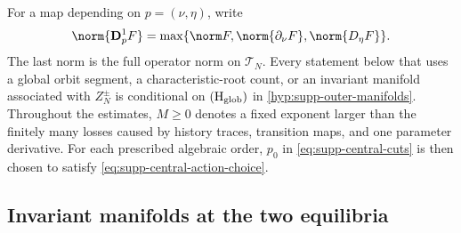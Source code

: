 For a map depending on \(p=(\nu,\eta)\), write
\[
 \norm{\mathbf D_p^1F}
 =\max\{\norm F,\norm{\partial_\nu F},\norm{D_\eta F}\}.
\]
The last norm is the full operator norm on
\(\mathcal T_N\).
Every statement below that uses a global orbit segment, a characteristic-root
count, or an invariant manifold associated with \(Z_N^\pm\) is conditional on
\(\mathrm{(H_{\rm glob})}\) in
\cref{hyp:supp-outer-manifolds}.
Throughout the estimates, \(M\ge0\) denotes a fixed exponent larger than
the finitely many losses caused by history traces, transition maps, and one
parameter derivative.  For each prescribed algebraic order, \(p_0\) in
\cref{eq:supp-central-cuts} is then chosen to satisfy
\cref{eq:supp-central-action-choice}.

\subsection{Invariant manifolds at the two equilibria}

